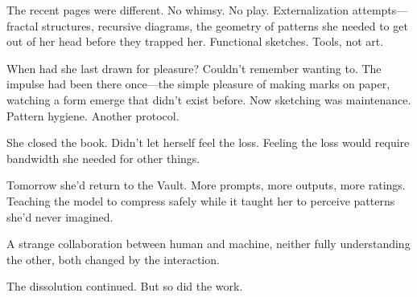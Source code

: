 The recent pages were different. No whimsy. No play. Externalization attempts—fractal structures, recursive diagrams, the geometry of patterns she needed to get out of her head before they trapped her. Functional sketches. Tools, not art.

When had she last drawn for pleasure? Couldn't remember wanting to. The impulse had been there once—the simple pleasure of making marks on paper, watching a form emerge that didn't exist before. Now sketching was maintenance. Pattern hygiene. Another protocol.

She closed the book. Didn't let herself feel the loss. Feeling the loss would require bandwidth she needed for other things.

Tomorrow she'd return to the Vault. More prompts, more outputs, more ratings. Teaching the model to compress safely while it taught her to perceive patterns she'd never imagined.

A strange collaboration between human and machine, neither fully understanding the other, both changed by the interaction.

The dissolution continued. But so did the work.
